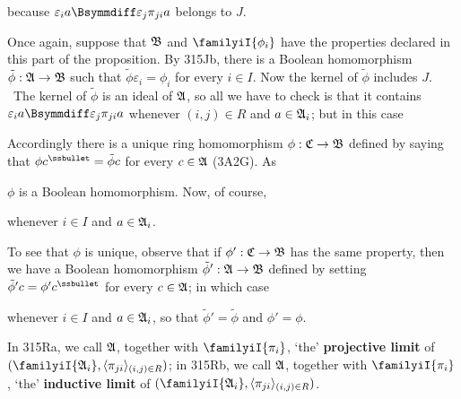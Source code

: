 {\noindent because $\varepsilon_ia\Bsymmdiff\varepsilon_j\pi_{ji}a$ belongs to
$J$.

Once again, suppose that $\frak B$ and $\familyiI{\phi_i}$ have the
properties declared in this part of the proposition.   By 315Jb, there is a
Boolean homomorphism $\tilde\phi:\frak A\to\frak B$ such that
$\tilde\phi\varepsilon_i=\phi_i$ for every $i\in I$.   Now the kernel of
$\tilde\phi$ includes $J$.   \Prf\ The kernel of $\tilde\phi$ is an ideal
of $\frak A$, so all we have to check is that it contains
$\varepsilon_ia\Bsymmdiff\varepsilon_j\pi_{ji}a$ whenever $(i,j)\in R$ and
$a\in\frak A_i$;  but in this case


Accordingly there is a unique ring homomorphism
$\phi:\frak C\to\frak B$ defined by saying that
$\phi c^{\ssbullet}=\tilde\phi c$ for every $c\in\frak A$ (3A2G).   As


\noindent $\phi$ is a Boolean homomorphism.   Now, of course,


\noindent whenever $i\in I$ and $a\in\frak A_i$.

To see that $\phi$ is unique, observe that if $\phi':\frak C\to\frak B$ has
the same property, then we have a Boolean homomorphism
$\tilde\phi':\frak A\to\frak B$ defined by setting
$\tilde\phi'c=\phi'c^{\ssbullet}$ for every $c\in\frak A$;  in which case


\noindent whenever $i\in I$ and $a\in\frak A_i$, so that
$\tilde\phi'=\tilde\phi$ and $\phi'=\phi$.
}%

 In 315Ra, we call $\frak A$, together with
$\familyiI{\pi_i}$, `the' {\bf projective limit} of
$(\familyiI{\frak A_i},\langle\pi_{ji}\rangle_{(i,j)\in R})$;  in
315Rb, we call $\frak A$, together with
$\familyiI{\pi_i}$, `the' {\bf inductive limit} of
$(\familyiI{\frak A_i},\langle\pi_{ji}\rangle_{(i,j)\in R})$.


